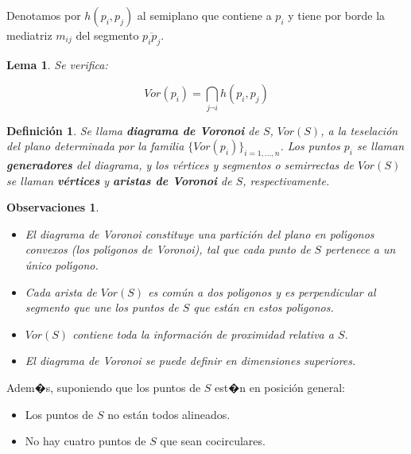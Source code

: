 \documentclass[ebook,oneside]{memoir}
\newtheorem{lema}[thm]{Lema}
\newtheorem{defn}[thm]{Definición}
\newtheorem{rem}[thm]{Observaciones}
\begin{document}
Denotamos por $h(p_i,p_j)$ al semiplano que contiene a $p_i$ y
tiene por borde la mediatriz $m_{ij}$ del segmento
$\overline{p_ip_j}$.

\begin{lema} Se verifica:

$$Vor(p_i)= \bigcap _{j\neg i} h(p_i,p_j)$$


\end{lema}

\begin{defn} Se llama \textbf{diagrama de Voronoi} de $S$,
$Vor(S)$, a la teselaci\'{o}n del plano determinada por la familia
$\{Vor(p_i)\}_{i=1,\dots,n}$. Los puntos $p_i$ se llaman \textbf{generadores} del diagrama, y los v\'{e}rtices y segmentos o
semirrectas de $Vor(S)$ se llaman \textbf{v\'{e}rtices} y \textbf{aristas de Voronoi} de $S$, respectivamente.
\end{defn}

\begin{rem}
\begin{itemize}

  \item El diagrama de Voronoi constituye una partici\'{o}n del plano en pol\'{\i}gonos convexos (los pol\'{\i}gonos de Voronoi), tal que cada punto de $S$ pertenece a un \'{u}nico pol\'{\i}gono.

  \item Cada arista de $Vor(S)$ es com\'{u}n a dos pol\'{\i}gonos y es perpendicular al segmento que une los puntos de $S$ que est\'{a}n en estos pol\'{\i}gonos.

  \item $Vor(S)$ contiene toda la informaci\'{o}n de proximidad relativa a $S$.

  \item El diagrama de Voronoi se puede definir en dimensiones superiores.

\end{itemize}
\end{rem}

\vspace{0.3cm}
\noindent Adem�s, suponiendo que los puntos de $S$ est�n en posici\'on general:

\begin{itemize}

  \item Los puntos de $S$ no est\'{a}n todos alineados.

  \item No hay cuatro puntos de $S$ que sean cocirculares.

\end{itemize}
\end{document}
